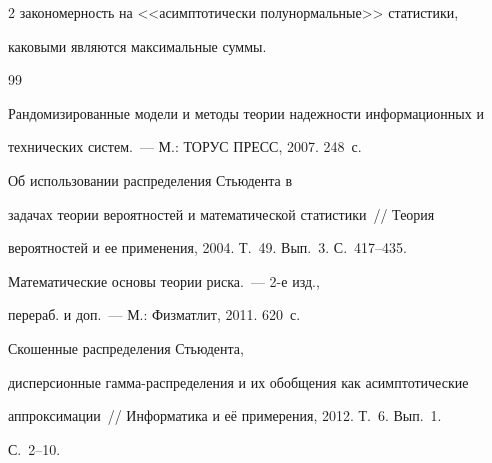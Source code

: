 \begin{multicols}{2}
закономерность на <<асимптотически полунормальные>> статистики,


каковыми являются максимальные суммы.





{\small\frenchspacing


{%




\begin{thebibliography}{99}









Рандомизированные модели и методы тео\-рии на\-деж\-ности информационных и


технических сис\-тем.~--- М.: ТОРУС ПРЕСС, 2007. 248~с.







 Об использовании распределения Стьюдента в


задачах теории вероятностей и математической статистики~// Теория


вероятностей и ее применения, 2004. Т.~49. Вып.~3. С.~417--435.









Математические основы теории риска.~--- 2-е изд.,


перераб. и доп.~--- М.: Физматлит, 2011. 620~с.







 Скошенные распределения Стьюдента,


дисперсионные гам\-ма-рас\-пре\-де\-ле\-ния и их обобщения как асимптотические


аппроксимации~// Информатика и её примерения, 2012. Т.~6. Вып.~1.


С.~2--10.






\end{thebibliography}}}
\end{multicols}
